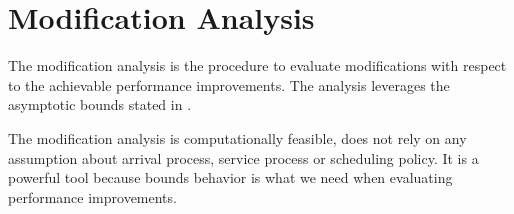 \section{Modification Analysis}
\label{sec:Modification-Analysis}

The modification analysis is the procedure to evaluate modifications with respect to the achievable performance improvements. The analysis leverages the asymptotic bounds stated in .

The modification analysis is computationally feasible, does not rely on any assumption about arrival process, service process or scheduling policy. It is a powerful tool because bounds behavior is what we need when evaluating performance improvements.